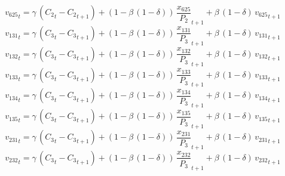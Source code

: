 \begin{dmath}
{{v_{625}}}_{t}={{\gamma}}\, \left({{C_{2}}}_{t}-{{C_{2}}}_{t+1}\right)+\left(1-{{\beta}}\, \left(1-{{\delta}}\right)\right)\, {{\frac{x_{625}}{P_{2}}}}_{t+1}+{{\beta}}\, \left(1-{{\delta}}\right)\, {{v_{625}}}_{t+1}
\end{dmath}
\begin{dmath}
{{v_{131}}}_{t}={{\gamma}}\, \left({{C_{3}}}_{t}-{{C_{3}}}_{t+1}\right)+\left(1-{{\beta}}\, \left(1-{{\delta}}\right)\right)\, {{\frac{x_{131}}{P_{3}}}}_{t+1}+{{\beta}}\, \left(1-{{\delta}}\right)\, {{v_{131}}}_{t+1}
\end{dmath}
\begin{dmath}
{{v_{132}}}_{t}={{\gamma}}\, \left({{C_{3}}}_{t}-{{C_{3}}}_{t+1}\right)+\left(1-{{\beta}}\, \left(1-{{\delta}}\right)\right)\, {{\frac{x_{132}}{P_{3}}}}_{t+1}+{{\beta}}\, \left(1-{{\delta}}\right)\, {{v_{132}}}_{t+1}
\end{dmath}
\begin{dmath}
{{v_{133}}}_{t}={{\gamma}}\, \left({{C_{3}}}_{t}-{{C_{3}}}_{t+1}\right)+\left(1-{{\beta}}\, \left(1-{{\delta}}\right)\right)\, {{\frac{x_{133}}{P_{3}}}}_{t+1}+{{\beta}}\, \left(1-{{\delta}}\right)\, {{v_{133}}}_{t+1}
\end{dmath}
\begin{dmath}
{{v_{134}}}_{t}={{\gamma}}\, \left({{C_{3}}}_{t}-{{C_{3}}}_{t+1}\right)+\left(1-{{\beta}}\, \left(1-{{\delta}}\right)\right)\, {{\frac{x_{134}}{P_{3}}}}_{t+1}+{{\beta}}\, \left(1-{{\delta}}\right)\, {{v_{134}}}_{t+1}
\end{dmath}
\begin{dmath}
{{v_{135}}}_{t}={{\gamma}}\, \left({{C_{3}}}_{t}-{{C_{3}}}_{t+1}\right)+\left(1-{{\beta}}\, \left(1-{{\delta}}\right)\right)\, {{\frac{x_{135}}{P_{3}}}}_{t+1}+{{\beta}}\, \left(1-{{\delta}}\right)\, {{v_{135}}}_{t+1}
\end{dmath}
\begin{dmath}
{{v_{231}}}_{t}={{\gamma}}\, \left({{C_{3}}}_{t}-{{C_{3}}}_{t+1}\right)+\left(1-{{\beta}}\, \left(1-{{\delta}}\right)\right)\, {{\frac{x_{231}}{P_{3}}}}_{t+1}+{{\beta}}\, \left(1-{{\delta}}\right)\, {{v_{231}}}_{t+1}
\end{dmath}
\begin{dmath}
{{v_{232}}}_{t}={{\gamma}}\, \left({{C_{3}}}_{t}-{{C_{3}}}_{t+1}\right)+\left(1-{{\beta}}\, \left(1-{{\delta}}\right)\right)\, {{\frac{x_{232}}{P_{3}}}}_{t+1}+{{\beta}}\, \left(1-{{\delta}}\right)\, {{v_{232}}}_{t+1}
\end{dmath}
